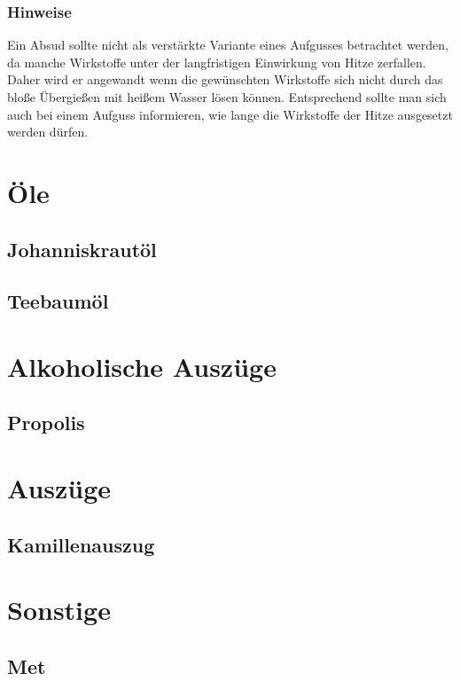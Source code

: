 \subsubsection{Hinweise}
Ein Absud sollte nicht als verstärkte Variante eines Aufgusses betrachtet werden, da manche Wirkstoffe unter der langfristigen Einwirkung von Hitze zerfallen. Daher wird er angewandt wenn die gewünschten Wirkstoffe sich nicht durch das bloße Übergießen mit heißem Wasser lösen können. Entsprechend sollte man sich auch bei einem Aufguss informieren, wie lange die Wirkstoffe der Hitze ausgesetzt werden dürfen.

\section{Öle}

\subsection{Johanniskrautöl}

\subsection{Teebaumöl}

\section{Alkoholische Auszüge}

\subsection{Propolis}

\section{Auszüge}

\subsection{Kamillenauszug}

\section{Sonstige}

\subsection{Met}

